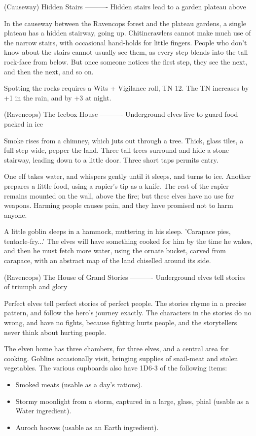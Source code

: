 (Causeway) Hidden Stairs
----------
{Hidden stairs lead to a garden plateau above}

In the causeway between the Ravencops forest and the plateau gardens, a single plateau has a hidden stairway, going up.
Chitincrawlers cannot make much use of the narrow stairs, with occasional hand-holds for little fingers.
People who don't know about the stairs cannot usually see them, as every step blends into the tall rock-face from below.
But once someone notices the first step, they see the next, and then the next, and so on.

Spotting the rocks requires a Wits + Vigilance roll, TN 12.
The TN increases by +1 in the rain, and by +3 at night.

(Ravencops) The Icebox House
----------
{Underground elves live to guard food packed in ice}

Smoke rises from a chimney, which juts out through a tree.
Thick, glass tiles, a full step wide, pepper the land.
Three tall trees surround and hide a stone stairway, leading down to a little door.
Three short taps permits entry.

One elf takes water, and whispers gently until it sleeps, and turns to ice.
Another prepares a little food, using a rapier's tip as a knife.
The rest of the rapier remains mounted on the wall, above the fire; but these elves have no use for weapons.
Harming people causes pain, and they have promised not to harm anyone.

A little goblin sleeps in a hammock, muttering in his sleep.
'Carapace pies, tentacle-fry...'
The elves will have something cooked for him by the time he wakes, and then he must fetch more water, using the ornate bucket, carved from carapace, with an abstract map of the land chiselled around its side.

(Ravencops) The House of Grand Stories
----------
{Underground elves tell stories of triumph and glory}

Perfect elves tell perfect stories of perfect people.
The stories rhyme in a precise pattern, and follow the hero's journey exactly.
The characters in the stories do no wrong, and have no fights, because fighting hurts people, and the storytellers never think about hurting people.

The elven home has three chambers, for three elves, and a central area for cooking.
Goblins occasionally visit, bringing supplies of snail-meat and stolen vegetables.
The various cupboards also have 1D6-3 of the following items:

\begin{itemize}
  \item
  Smoked meats (usable as a day's rations).
  \item
  Stormy moonlight from a storm, captured in a large, glass, phial (usable as a Water \gls{ingredient}).
  \item
  Auroch hooves (usable as an Earth \gls{ingredient}).
\end{itemize}

